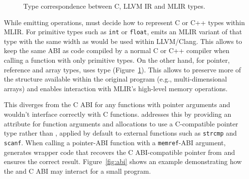 \begin{figure}
  \centering
  \caption{Type correspondence between C, LLVM IR and MLIR types.}
  \label{fig:types}
\end{figure}

While emitting operations, \tool must decide how to represent C or C++ types within MLIR. For primitive types such as \texttt{int} or \texttt{float}, \tool emits an MLIR variant of that type with the same width as would be used within LLVM/Clang. This allows \tool to keep the same ABI as code compiled by a normal C or C++ compiler when calling a function with only primitive types. On the other hand, for pointer, reference and array types, \tool uses \memref type (Figure~\ref{fig:types}). This allows \tool to preserve more of the structure available within the original program (e.g., multi-dimensional arrays) and enables interaction with MLIR's high-level memory operations.

This diverges from the C ABI for any functions with pointer arguments and wouldn't interface correctly with C functions. \tool addresses this by providing an attribute for function arguments and allocations to use a C-compatible pointer type rather than \memref, applied by default to external functions such as \texttt{strcmp} and \texttt{scanf}. When calling a pointer-ABI function with a \texttt{memref}-ABI argument, \tool generates wrapper code that recovers the C ABI-compatible pointer from \memref and ensures the correct result.
Figure~\ref{fig:abi} shows an example demonstrating how the \tool and C ABI may interact for a small program.

